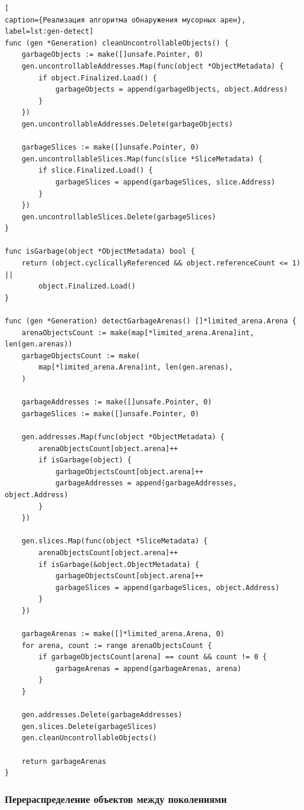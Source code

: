 \begin{lstlisting}[
caption={Реализация алгоритма обнаружения мусорных арен},
label=lst:gen-detect]
func (gen *Generation) cleanUncontrollableObjects() {
	garbageObjects := make([]unsafe.Pointer, 0)
	gen.uncontrollableAddresses.Map(func(object *ObjectMetadata) {
		if object.Finalized.Load() {
			garbageObjects = append(garbageObjects, object.Address)
		}
	})
	gen.uncontrollableAddresses.Delete(garbageObjects)
	
	garbageSlices := make([]unsafe.Pointer, 0)
	gen.uncontrollableSlices.Map(func(slice *SliceMetadata) {
		if slice.Finalized.Load() {
			garbageSlices = append(garbageSlices, slice.Address)
		}
	})
	gen.uncontrollableSlices.Delete(garbageSlices)
}

func isGarbage(object *ObjectMetadata) bool {
	return (object.cyclicallyReferenced && object.referenceCount <= 1) || 
		object.Finalized.Load()
}

func (gen *Generation) detectGarbageArenas() []*limited_arena.Arena {
	arenaObjectsCount := make(map[*limited_arena.Arena]int, len(gen.arenas))
	garbageObjectsCount := make(
		map[*limited_arena.Arena]int, len(gen.arenas),
	)
	
	garbageAddresses := make([]unsafe.Pointer, 0)
	garbageSlices := make([]unsafe.Pointer, 0)
	
	gen.addresses.Map(func(object *ObjectMetadata) {
		arenaObjectsCount[object.arena]++
		if isGarbage(object) {
			garbageObjectsCount[object.arena]++
			garbageAddresses = append(garbageAddresses, object.Address)
		}
	})
	
	gen.slices.Map(func(object *SliceMetadata) {
		arenaObjectsCount[object.arena]++
		if isGarbage(&object.ObjectMetadata) {
			garbageObjectsCount[object.arena]++
			garbageSlices = append(garbageSlices, object.Address)
		}
	})
	
	garbageArenas := make([]*limited_arena.Arena, 0)
	for arena, count := range arenaObjectsCount {
		if garbageObjectsCount[arena] == count && count != 0 {
			garbageArenas = append(garbageArenas, arena)
		}
	}
	
	gen.addresses.Delete(garbageAddresses)
	gen.slices.Delete(garbageSlices)
	gen.cleanUncontrollableObjects()
	
	return garbageArenas
}
\end{lstlisting}



\subsubsection{Перераспределение объектов между поколениями}

